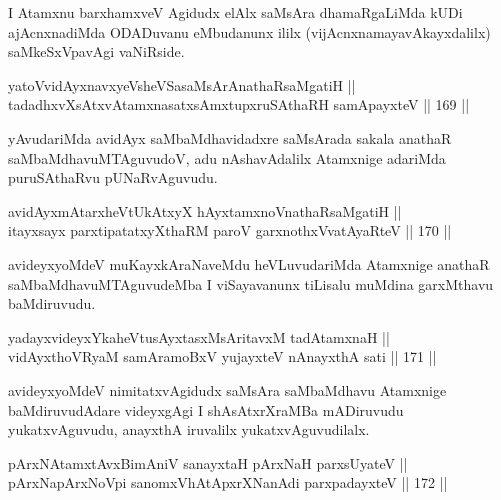 \begin{artha}
I Atamxnu barxhamxveV Agidudx elAlx saMsAra dhamaRgaLiMda kUDi
ajAcnxnadiMda ODADuvanu eMbudanunx ililx (vijAcnxnamayavAkayxdalilx)
saMkeSxVpavAgi vaNiRside.
\end{artha}


\begin{shl}
yatoV\s vidAyxnavxyeV\s sheVSasaMsArAnathaRsaMgatiH || \\
tadadhxvXsAtxvAtamxnasatxsAmxtupxruSAthaRH samApayxteV \hfill || 169 ||  
\end{shl}

\begin{artha}
yAvudariMda avidAyx saMbaMdhavidadxre saMsArada sakala anathaR
saMbaMdhavuMTAguvudoV, adu nAshavAdalilx Atamxnige adariMda
puruSAthaRvu pUNaRvAguvudu.
\end{artha}

\begin{shl}
avidAyxmAtarxheVtUkAtxyX hAyxtamxnoV\s nathaRsaMgatiH || \\
itayxsayx parxtipatatxyXthaRM paroV garxnothxV\s vatAyaRteV \hfill || 170 ||  
\end{shl}

\begin{artha}
avideyxyoMdeV muKayxkAraNaveMdu heVLuvudariMda Atamxnige anathaR
saMbaMdhavuMTAguvudeMba I viSayavanunx tiLisalu muMdina garxMthavu
baMdiruvudu.
\end{artha}


\begin{shl}
yadayxvideyxYkaheVtusAyxtasxMsAritavxM tadA\s \s tamxnaH ||  \\
vidAyxthoVR\s yaM samAramoBxV yujayxteV nAnayxthA sati \hfill || 171 ||  
\end{shl}

\begin{artha}
avideyxyoMdeV nimitatxvAgidudx saMsAra saMbaMdhavu Atamxnige
baMdiruvudAdare videyxgAgi I shAsAtxrXraMBa mADiruvudu yukatxvAguvudu,
anayxthA iruvalilx yukatxvAguvudilalx.
\end{artha}


\begin{shl}
pArxNAtamxtAvxBimAniV sanayxtaH pArxNaH parxsUyateV || \\
pArxNapArxNoV\s pi sanomxVhAtApxrXNanAdi parxpadayxteV \hfill || 172 ||  
\end{shl}

